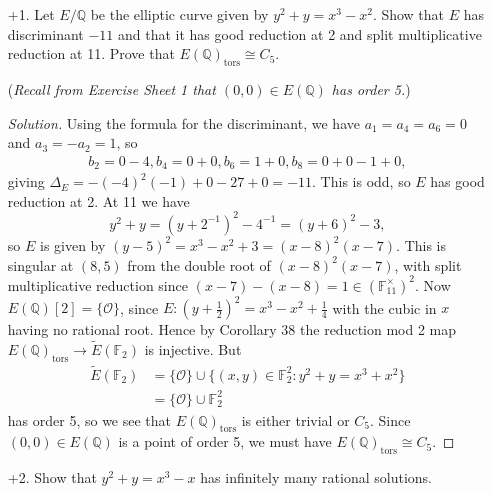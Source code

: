 \documentclass[a4paper]{article}
\theoremstyle{definition}
\newcommand{\tors}{\mathrm{tors}}
\renewcommand{\O}{\mathcal{O}}
\newcommand{\F}{\mathbb{F}}
\newcommand{\Q}{\mathbb{Q}}
\begin{document}
\begin{enumerate}
    \item[+1.] Let $E/\Q$ be the elliptic curve given by $y^2+y=x^3-x^2$. Show
        that $E$ has discriminant $-11$ and that it has good reduction at 2 and
        split multiplicative reduction at 11. Prove that $E(\Q)_\tors\cong C_5$.

        (\textit{Recall from Exercise Sheet 1 that $(0,0)\in E(\Q)$ has order
        5.})

        \begin{proof}[Solution]
            Using the formula for the discriminant, we have $a_1=a_4=a_6=0$ and
            $a_3=-a_2=1$, so
            \begin{align*}
                b_2=0-4, b_4=0+0, b_6=1+0, b_8=0+0-1+0,
            \end{align*}
            giving $\Delta_E = -(-4)^2(-1) + 0 - 27 + 0 = -11$. This is odd, so
            $E$ has good reduction at 2. At 11 we have
            \begin{equation*}
                y^2+y = (y+2^{-1})^2-4^{-1} = (y+6)^2-3,
            \end{equation*}
            so $E$ is given by $(y-5)^2=x^3-x^2+3=(x-8)^2(x-7)$. This is
            singular at $(8,5)$ from the double root of $(x-8)^2(x-7)$, with
            split multiplicative reduction since
            $(x-7)-(x-8)=1\in(\F_11^\times)^2$. Now $E(\Q)[2]=\{\O\}$, since
            $E:(y+\frac{1}{2})^2=x^3-x^2+\frac{1}{4}$ with the cubic in $x$
            having no rational root. Hence by Corollary 38 the reduction mod 2
            map $E(\Q)_\tors\to\tilde E(\F_2)$ is injective. But
            \begin{align*}
                \tilde E(\F_2)
                    &= \{\O\} \cup \{(x,y)\in\F_2^2:y^2+y=x^3+x^2\} \\
                    &= \{\O\} \cup \F_2^2
            \end{align*}
            has order 5, so we see that $E(\Q)_\tors$ is either trivial or
            $C_5$. Since $(0,0)\in E(\Q)$ is a point of order 5, we must have
            $E(\Q)_\tors\cong C_5$.
        \end{proof}

    \item[+2.] Show that $y^2+y=x^3-x$ has infinitely many rational solutions.


\end{enumerate}
\end{document}
